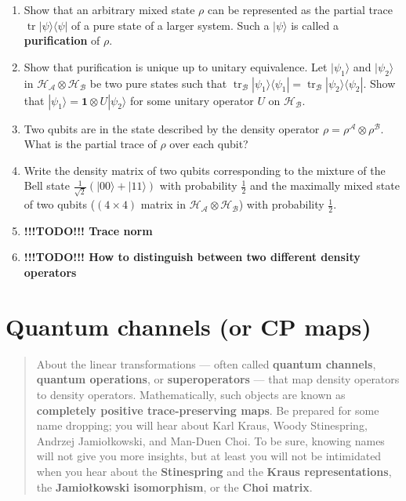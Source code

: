 \documentclass[fleqn]{article}
\let\oldsection\section
\renewcommand\section{\clearpage\oldsection}
\begin{document}
\begin{enumerate}
\def\labelenumi{\arabic{enumi}.}
\item
  Show that an arbitrary mixed state \(\rho\) can be represented as the partial trace \(\operatorname{tr}|\psi\rangle\langle\psi|\) of a pure state of a larger system.
  Such a \(|\psi\rangle\) is called a \textbf{purification} of \(\rho\).
\item
  Show that purification is unique up to unitary equivalence.
  Let \(|\psi_1\rangle\) and \(|\psi_2\rangle\) in \(\mathcal{H}_{\mathcal{A}}\otimes\mathcal{H}_{\mathcal{B}}\) be two pure states such that \(\operatorname{tr}_{\mathcal{B}}|\psi_1\rangle\langle\psi_1| = \operatorname{tr}_{\mathcal{B}}|\psi_2\rangle\langle\psi_2|\).
  Show that \(|\psi_1\rangle = \mathbf{1}\otimes U|\psi_2\rangle\) for some unitary operator \(U\) on \(\mathcal{H}_{\mathcal{B}}\).
\item
  Two qubits are in the state described by the density operator \(\rho = \rho^\mathcal{A}\otimes\rho^\mathcal{B}\).
  What is the partial trace of \(\rho\) over each qubit?
\item
  Write the density matrix of two qubits corresponding to the mixture of the Bell state \(\frac{1}{\sqrt 2}\left(|00\rangle + |11\rangle\right)\) with probability \(\frac12\) and the maximally mixed state of two qubits (\((4\times 4)\) matrix in \(\mathcal{H}_{\mathcal{A}}\otimes\mathcal{H}_{\mathcal{B}}\)) with probability \(\frac12\).
\item
  \textbf{!!!TODO!!! Trace norm}
\item
  \textbf{!!!TODO!!! How to distinguish between two different density operators}
\end{enumerate}

\hypertarget{chapter10}{%
\section{Quantum channels (or CP maps)}\label{chapter10}}

\begin{quote}
About the linear transformations --- often called \textbf{quantum channels}, \textbf{quantum operations}, or \textbf{superoperators} --- that map density operators to density operators. Mathematically, such objects are known as \textbf{completely positive trace-preserving maps}. Be prepared for some name dropping; you will hear about Karl Kraus, Woody Stinespring, Andrzej Jamiołkowski, and Man-Duen Choi. To be sure, knowing names will not give you more insights, but at least you will not be intimidated when you hear about the \textbf{Stinespring} and the \textbf{Kraus representations}, the \textbf{Jamiołkowski isomorphism}, or the \textbf{Choi matrix}.
\end{quote}
\end{document}
